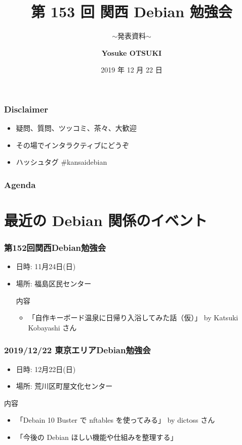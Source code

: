 \documentclass[cjk,dvipdfmx,10pt,compress,%
hyperref={bookmarks=true,bookmarksnumbered=true,bookmarksopen=false,%
colorlinks=false,%
pdftitle={第 153 回 関西 Debian 勉強会},%
pdfauthor={おおつき},%
pdfsubject={資料},%
}]{beamer}
\title{第 153 回 関西 Debian 勉強会}
\subtitle{$\sim$発表資料$\sim$}
\author[Yosuke OTSUKI]{{\large\bf Yosuke OTSUKI}}
\institute[Debian JP]{{\normalsize\tt 関西 Debian 勉強会}}
\date{{\small 2019 年 12 月 22 日}}
\begin{document}
\settitleslide
\begin{frame}
\titlepage
\end{frame}
\setdefaultslide

\begin{frame}[fragile]
  \frametitle{Disclaimer}
  \begin{itemize}
  \item 疑問、質問、ツッコミ、茶々、\alert{大歓迎}
  \item その場でインタラクティブにどうぞ
  \item ハッシュタグ \#kansaidebian
  \end{itemize}
\end{frame}

\begin{frame}[fragile]
\frametitle{Agenda}

\tableofcontents

\end{frame}

\section{最近の Debian 関係のイベント}

\begin{frame}[fragile]
  \frametitle{第152回関西Debian勉強会}
  \begin{itemize}
  \item 日時: 11月24日(日)
  \item 場所: 福島区民センター
  \begin{block}{内容}
    \begin{itemize}
    \item 「自作キーボード温泉に日帰り入浴してみた話（仮）」 by Katsuki Kobayashi さん
    \end{itemize}
  \end{block}
\end{itemize}
\end{frame}

\begin{frame}[fragile]
  \frametitle{2019/12/22 東京エリアDebian勉強会}
  \begin{itemize}
  \item 日時: 12月22日(日)
  \item 場所: 荒川区町屋文化センター
  \end{itemize}
  \begin{block}{内容}
    \begin{itemize}
    \item 「Debain 10 Buster で nftables を使ってみる」 by dictoss さん
    \item 「今後の Debian ほしい機能や仕組みを整理する」
    \end{itemize}
  \end{block}
\end{frame}
\end{document}
